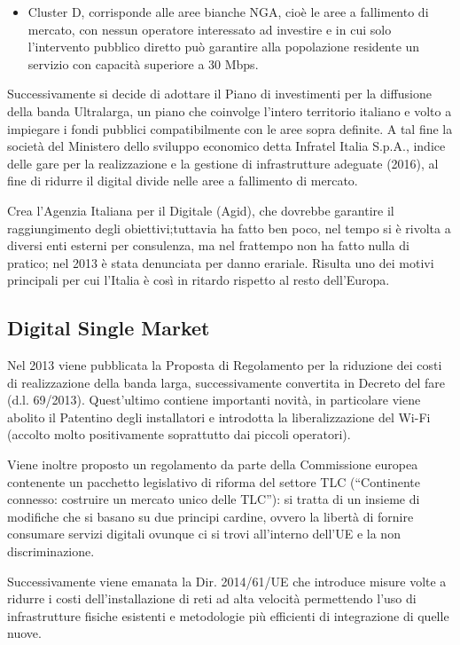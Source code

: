 \begin{itemize}
\begin{itemize}
        \item Cluster D, corrisponde alle aree bianche NGA, cioè le aree a fallimento di mercato, con nessun operatore interessato ad investire e in cui solo l’intervento pubblico diretto può garantire alla popolazione residente un servizio con capacità superiore a 30 Mbps.
    \end{itemize}
    Successivamente si decide di adottare il Piano di investimenti per la diffusione della banda Ultralarga, un piano che coinvolge l’intero territorio italiano e volto a impiegare i fondi pubblici compatibilmente con le aree sopra definite. A tal fine la società del Ministero dello sviluppo economico detta Infratel Italia S.p.A., indice delle gare per la realizzazione e la gestione di infrastrutture adeguate (2016), al fine di ridurre il digital divide nelle aree a fallimento di mercato.

    Crea l’Agenzia Italiana per il Digitale (Agid), che dovrebbe garantire il raggiungimento degli obiettivi;tuttavia ha fatto ben poco, nel tempo si è rivolta a diversi enti esterni per consulenza, ma nel frattempo non ha fatto nulla di pratico; nel 2013 è stata denunciata per danno erariale. Risulta uno dei motivi principali per cui l’Italia è così in ritardo rispetto al resto dell’Europa.
\end{itemize}

\subsection{Digital Single Market}
Nel 2013 viene pubblicata la Proposta di Regolamento per la riduzione dei costi di realizzazione della banda larga, successivamente convertita in Decreto del fare (d.l. 69/2013). Quest’ultimo contiene importanti novità, in particolare viene abolito il Patentino degli installatori e introdotta la liberalizzazione del Wi-Fi (accolto molto positivamente soprattutto dai piccoli operatori).\bigskip

Viene inoltre proposto un regolamento da parte della Commissione europea contenente un pacchetto legislativo di riforma del settore TLC (“Continente connesso: costruire un mercato unico delle TLC”): si tratta di un insieme di modifiche che si basano su due principi cardine, ovvero la libertà di fornire consumare servizi digitali ovunque ci si trovi all’interno dell’UE e la non discriminazione.\bigskip

Successivamente viene emanata la Dir. 2014/61/UE che introduce misure volte a ridurre i costi dell’installazione di reti ad alta velocità permettendo l’uso di infrastrutture fisiche esistenti e metodologie più efficienti di integrazione di quelle nuove.\bigskip

